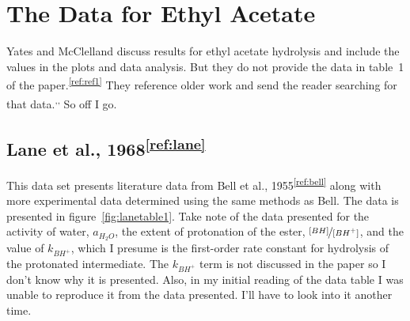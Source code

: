 \documentclass[]{tufte-handout}
\newcommand{\tss}[1]{\textsuperscript{#1}}
\begin{document}
\section{The Data for Ethyl Acetate}

Yates and McClelland discuss results for ethyl acetate hydrolysis and include the values in the plots and data analysis. But they do not provide the data in table~1 of the paper.\tss{\ref{ref:ref1}} They reference older work and send the reader searching for that data.\tss{,}\tss{,} So off I go.

\subsection{Lane et al., 1968\tss{\ref{ref:lane}}}

This data set presents literature data from Bell et al., 1955\tss{\ref{ref:bell}} along with more experimental data determined using the same methods as Bell. The data is presented in figure~\vref{fig:lanetable1}. Take note of the data presented for the activity of water, $a_{H_2O}$, the extent of protonation of the ester, $\nicefrac{[BH]}{[BH^+]}$, and the value of $k_{BH^+}$, which I presume is the first-order rate constant for hydrolysis of the protonated intermediate. The $k_{BH^+}$ term is not discussed in the paper so I don't know why it is presented. Also, in my initial reading of the data table I was unable to reproduce it from the data presented. I'll have to look into it another time.
\end{document}
